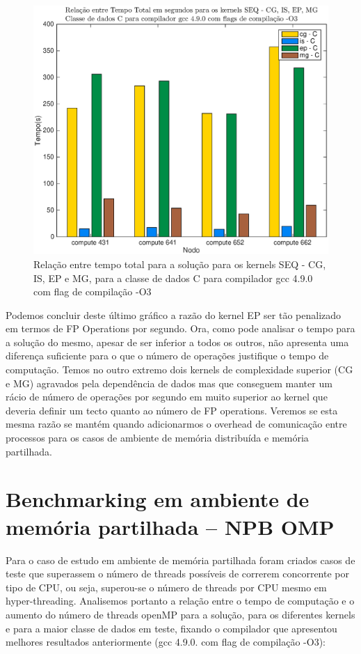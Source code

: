 \documentclass[conference,compsoc]{IEEEtran}
\begin{document}
\begin{figure}[H]
\centering
\includegraphics[width=1.1\columnwidth]{EPS/SEQ/TEMPO_seq_gcc_C_all.eps}
\caption{Relação entre tempo total para a solução para os kernels SEQ - CG, IS, EP e MG, para a classe de dados C para compilador gcc 4.9.0 com flag de compilação -O3}
\label{tempo_seq_all_c}
\end{figure}

Podemos concluir deste último gráfico a razão do kernel EP ser tão penalizado em termos de FP Operations por segundo. Ora, como pode analisar o tempo para a solução do mesmo, apesar de ser inferior a todos os outros, não apresenta uma diferença suficiente para o que o número de operações justifique o tempo de computação. Temos no outro extremo dois kernels de complexidade superior (CG e MG) agravados pela dependência de dados mas que conseguem manter um rácio de número de operações por segundo em muito superior ao kernel que deveria definir um tecto quanto ao número de FP operations. Veremos se esta mesma razão se mantém quando adicionarmos o overhead de comunicação entre processos para os casos de ambiente de memória distribuída e memória partilhada.

\section{Benchmarking em ambiente de memória partilhada -- NPB OMP}

Para o caso de estudo em ambiente de memória partilhada foram criados casos de teste que superassem o número de threads possíveis de correrem concorrente por tipo de CPU, ou seja, superou-se o número de threads por CPU mesmo em hyper-threading. Analisemos portanto a relação entre o tempo de computação e o aumento do número de threads openMP para a solução, para os diferentes kernels e para a maior classe de dados em teste, fixando o compilador que apresentou melhores resultados anteriormente (gcc 4.9.0. com flag de compilação -O3):
\end{document}
